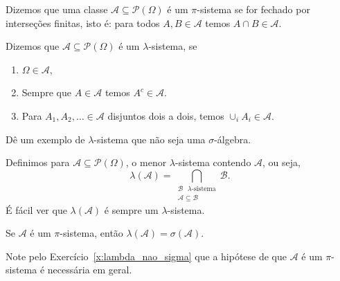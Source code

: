 \begin{definition}
  Dizemos que uma classe $\mathcal{A} \subseteq \mathcal{P}(\Omega)$ é um $\pi$-sistema  se for fechado por interseções finitas, isto é: para todos $A, B \in \mathcal{A}$ temos $A \cap B \in \mathcal{A}$.
\end{definition}

\begin{definition}
  Dizemos que $\mathcal{A} \subseteq \mathcal{P}(\Omega)$ é um $\lambda$-sistema,  se
  \begin{enumerate}[\quad a)]
  \item $\Omega \in \mathcal{A}$,
  \item Sempre que $A \in \mathcal{A}$ temos $A^c \in \mathcal{A}$.
  \item Para $A_1, A_2, \dots \in \mathcal{A}$ disjuntos dois a dois, temos $\cup_i A_i \in \mathcal{A}$.
  \end{enumerate}
\end{definition}

\begin{exercise}
  \label{x:lambda_nao_sigma}
  Dê um exemplo de $\lambda$-sistema que não seja uma $\sigma$-álgebra.
\end{exercise}

Definimos para $\mathcal{A} \subseteq \mathcal{P}(\Omega)$, o menor $\lambda$-sistema contendo $\mathcal{A}$, ou seja,
\begin{equation}
  \lambda(\mathcal{A}) = \bigcap_{\substack{\text{$\mathcal{B}$ $\lambda$-sistema}\\\mathcal{A} \subseteq \mathcal{B}}} \mathcal{B}.
\end{equation}
É fácil ver que $\lambda(\mathcal{A})$ é sempre um $\lambda$-sistema.

\begin{theorem}[Dynkin]
  \label{t:dynkin}
  Se $\mathcal{A}$ é um $\pi$-sistema, então $\lambda(\mathcal{A}) = \sigma(\mathcal{A})$.
\end{theorem}

Note pelo Exercício~\ref{x:lambda_nao_sigma} que a hipótese de que $\mathcal{A}$ é um $\pi$-sistema é necessária em geral.

